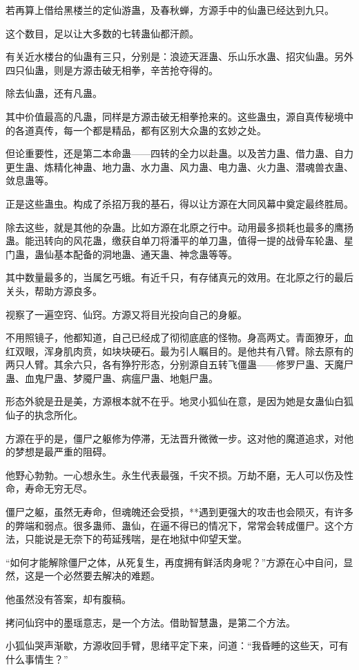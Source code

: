 \begin{this_body}
若再算上借给黑楼兰的定仙游蛊，及春秋蝉，方源手中的仙蛊已经达到九只。

这个数目，足以让大多数的七转蛊仙都汗颜。

有关近水楼台的仙蛊有三只，分别是：浪迹天涯蛊、乐山乐水蛊、招灾仙蛊。另外四只仙蛊，则是方源击破无相拳，辛苦抢夺得的。

除去仙蛊，还有凡蛊。

其中价值最高的凡蛊，同样是方源击破无相拳抢来的。这些蛊虫，源自真传秘境中的各道真传，每一个都是精品，都有区别大众蛊的玄妙之处。

但论重要性，还是第二本命蛊——四转的全力以赴蛊。以及苦力蛊、借力蛊、自力更生蛊、炼精化神蛊、地力蛊、水力蛊、风力蛊、电力蛊、火力蛊、潜魂兽衣蛊、敛息蛊等。

正是这些蛊虫。构成了杀招万我的基石，得以让方源在大同风幕中奠定最终胜局。

除去这些，就是其他的杂蛊。比如方源在北原之行中。动用最多损耗也最多的鹰扬蛊。能迅转向的风花蛊，缴获自单刀将潘平的单刀蛊，值得一提的战骨车轮蛊、星门蛊，蛊仙基本配备的洞地蛊、通天蛊、神念蛊等等。

其中数量最多的，当属乞丐蛾。有近千只，有存储真元的效用。在北原之行的最后关头，帮助方源良多。

视察了一遍空窍、仙窍。方源又将目光投向自己的身躯。

不用照镜子，他都知道，自己已经成了彻彻底底的怪物。身高两丈。青面獠牙，血红双眼，浑身肌肉贲，如块块硬石。最为引人瞩目的。是他共有八臂。除去原有的两只人臂。其余六只，各有狰狞形态，分别源自五转飞僵蛊——修罗尸蛊、天魔尸蛊、血鬼尸蛊、梦魇尸蛊、病瘟尸蛊、地魁尸蛊。

形态外貌是丑是美，方源根本就不在乎。地灵小狐仙在意，是因为她是女蛊仙白狐仙子的执念所化。

方源在乎的是，僵尸之躯修为停滞，无法晋升微微一步。这对他的魔道追求，对他的梦想是最严重的阻碍。

他野心勃勃。一心想永生。永生代表最强，千灾不损。万劫不磨，无人可以伤及性命，寿命无穷无尽。

僵尸之躯，虽然无寿命，但魂魄还会受损，**遇到更强大的攻击也会陨灭，有许多的弊端和弱点。很多蛊师、蛊仙，在逼不得已的情况下，常常会转成僵尸。这个方法，只能说是无奈下的苟延残喘，是在地狱中仰望天堂。

“如何才能解除僵尸之体，从死复生，再度拥有鲜活肉身呢？”方源在心中自问，显然，这是一个必然要去解决的难题。

他虽然没有答案，却有腹稿。

拷问仙窍中的墨瑶意志，是一个方法。借助智慧蛊，是第二个方法。

小狐仙哭声渐歇，方源收回手臂，思绪平定下来，问道：“我昏睡的这些天，可有什么事情生？”


\end{this_body}
